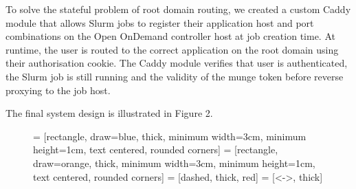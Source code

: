 \documentclass[sigconf,authordraft]{acmart}
\begin{document}
To solve the stateful problem of root domain routing, we created a custom Caddy module that allows Slurm jobs to register their application host and port combinations on the Open OnDemand controller host at job creation time. At runtime, the user is routed to the correct application on the root domain using their authorisation cookie. The Caddy module verifies that user is authenticated, the Slurm job is still running and the validity of the munge token before reverse proxying to the job host.

The final system design is illustrated in Figure 2.

\begin{figure}[H]
 = [rectangle, draw=blue, thick, minimum width=3cm, minimum height=1cm, text centered, rounded corners]
 = [rectangle, draw=orange, thick, minimum width=3cm, minimum height=1cm, text centered, rounded corners]
 = [dashed, thick, red]
 = [<->, thick]
 
\end{figure}
\end{document}

